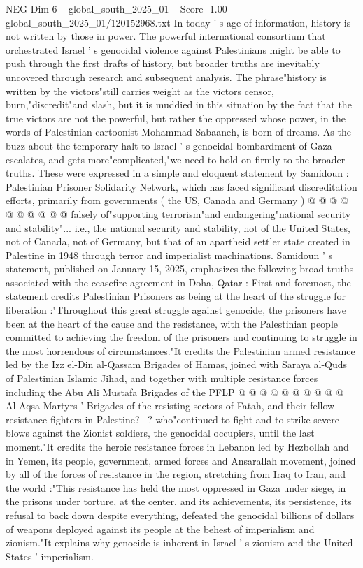 \begin{textsample}{NEG Dim 6 – global\_south\_2025\_01 – Score -1.00 – global\_south\_2025\_01/120152968.txt}  \label{ex:f6_neg_090}
In today ' s age of information, history is not written by those in power.
The powerful international consortium that orchestrated Israel ' s genocidal violence against Palestinians might be able to push through the first drafts of history, but broader truths are inevitably uncovered through research and subsequent analysis.
The phrase"history is written by the victors"still carries weight as the victors censor, burn,"discredit"and slash, but it is muddied in this situation by the fact that the true victors are not the powerful, but rather the oppressed whose power, in the words of Palestinian cartoonist Mohammad Sabaaneh, is born of dreams.
As the buzz about the temporary halt to Israel ' s genocidal bombardment of Gaza escalates, and gets more"complicated,"we need to hold on firmly to the broader truths.
These were expressed in a simple and eloquent statement by Samidoun : Palestinian Prisoner Solidarity Network, which has faced significant discreditation efforts, primarily from governments ( the US, Canada and Germany ) @ @ @ @ @ @ @ @ @ @ falsely of"supporting terrorism"and endangering"national security and stability"... i.e., the national security and stability, not of the United States, not of Canada, not of Germany, but that of an apartheid settler state created in Palestine in 1948 through terror and imperialist machinations.
Samidoun ' s statement, published on January 15, 2025, emphasizes the following broad truths associated with the ceasefire agreement in Doha, Qatar : First and foremost, the statement credits Palestinian Prisoners as being at the heart of the struggle for liberation :"Throughout this great struggle against genocide, the prisoners have been at the heart of the cause and the resistance, with the Palestinian people committed to achieving the freedom of the prisoners and continuing to struggle in the most horrendous of circumstances."It credits the Palestinian armed resistance led by the Izz el-Din al-Qassam Brigades of Hamas, joined with Saraya al-Quds of Palestinian Islamic Jihad, and together with multiple resistance forces including the Abu Ali Mustafa Brigades of the PFLP @ @ @ @ @ @ @ @ @ @ Al-Aqsa Martyrs ' Brigades of the resisting sectors of Fatah, and their fellow resistance fighters in Palestine? --? who"continued to fight and to strike severe blows against the Zionist soldiers, the genocidal occupiers, until the last moment."It credits the heroic resistance forces in Lebanon led by Hezbollah and in Yemen, its people, government, armed forces and Ansarallah movement, joined by all of the forces of resistance in the region, stretching from Iraq to Iran, and the world :"This resistance has held the most oppressed in Gaza under siege, in the prisons under torture, at the center, and its achievements, its persistence, its refusal to back down despite everything, defeated the genocidal billions of dollars of weapons deployed against its people at the behest of imperialism and zionism."It explains why genocide is inherent in Israel ' s zionism and the United States ' imperialism.

\end{textsample}
